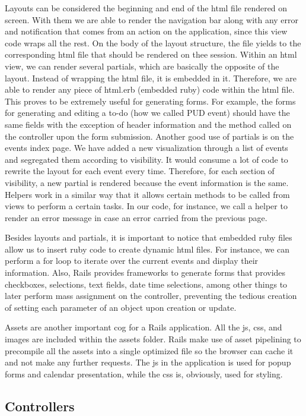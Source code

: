\documentclass[11pt]{article}
\begin{document}
Layouts can be considered the beginning and end of the html file rendered on screen. With them we are able to render the navigation bar along with any error and notification that comes from an action on the application, since this view code wraps all the rest. On the body of the layout structure, the file yields to the corresponding html file that should be rendered on thee session. Within an html view, we can render several partials, which are basically the opposite of the layout. Instead of wrapping the html file, it is embedded in it. Therefore, we are able to render any piece of html.erb (embedded ruby) code within the html file. This proves to be extremely useful for generating forms. For example, the forms for generating and editing a to-do (how we called PUD event) should have the same fields with the exception of header information and the method called on the controller upon the form submission. Another good use of partials is on the events index page. We have added a new visualization through a list of events and segregated them according to visibility. It would consume a lot of code to rewrite the layout for each event every time. Therefore, for each section of visibility, a new partial is rendered because the event information is the same. Helpers work in a similar way that it allows certain methods to be called from views to perform a certain tasks. In our code, for instance, we call a helper to render an error message in case an error carried from the previous page.

Besides layouts and partials, it is important to notice that embedded ruby files allow us to insert ruby code to create dynamic html files. For instance, we can perform a for loop to iterate over the current events and display their information. Also, Rails provides frameworks to generate forms that provides checkboxes, selections, text fields, date time selections, among other things to later perform mass assignment on the controller, preventing the tedious creation of setting each parameter of an object upon creation or update.

Assets are another important cog for a Rails application. All the js, css, and images are included within the assets folder. Rails make use of asset pipelining to precompile all the assets into a single optimized file so the browser can cache it and not make any further requests. The js in the application is used for popup forms and calendar presentation, while the css is, obviously, used for styling.

\subsection{Controllers}
\end{document}
